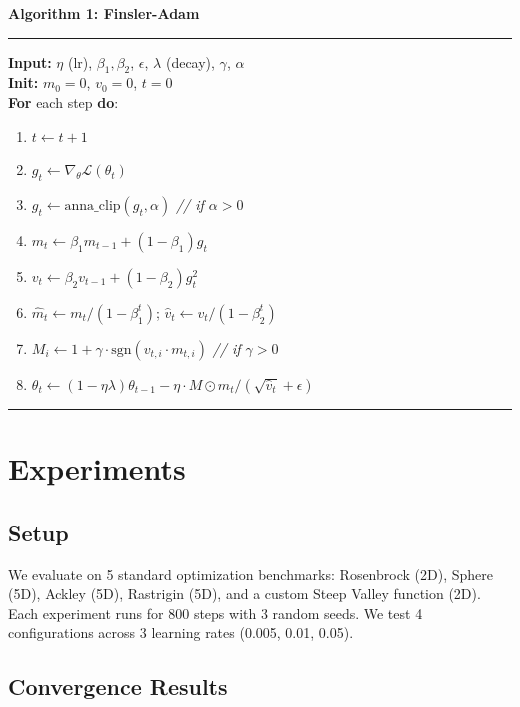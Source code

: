 \documentclass[11pt,a4paper,twocolumn]{article}
\begin{document}
\noindent\textbf{Algorithm 1: Finsler-Adam}
\vspace{0.3em}
\hrule
\vspace{0.3em}
\noindent\textbf{Input:} $\eta$ (lr), $\beta_1, \beta_2$, $\epsilon$, $\lambda$ (decay), $\gamma$, $\alpha$\\
\textbf{Init:} $m_0 = 0$, $v_0 = 0$, $t = 0$\\
\textbf{For} each step \textbf{do}:
\begin{enumerate}
  \setlength{\itemsep}{1pt}
  \item $t \leftarrow t + 1$
  \item $g_t \leftarrow \nabla_\theta \mathcal{L}(\theta_t)$
  \item $g_t \leftarrow \text{anna\_clip}(g_t, \alpha)$ \hfill\textit{// if $\alpha > 0$}
  \item $m_t \leftarrow \beta_1 m_{t-1} + (1-\beta_1) g_t$
  \item $v_t \leftarrow \beta_2 v_{t-1} + (1-\beta_2) g_t^2$
  \item $\hat{m}_t \leftarrow m_t / (1 - \beta_1^t)$; \quad $\hat{v}_t \leftarrow v_t / (1 - \beta_2^t)$
  \item $M_i \leftarrow 1 + \gamma \cdot \text{sgn}(v_{t,i} \cdot m_{t,i})$ \hfill\textit{// if $\gamma > 0$}
  \item $\theta_t \leftarrow (1-\eta\lambda)\theta_{t-1} - \eta \cdot M \odot \hat{m}_t / (\sqrt{\hat{v}_t} + \epsilon)$
\end{enumerate}
\vspace{-0.3em}
\hrule

\section{Experiments}

\subsection{Setup}

We evaluate on 5 standard optimization benchmarks: Rosenbrock (2D), Sphere (5D), Ackley (5D), Rastrigin (5D), and a custom Steep Valley function (2D). Each experiment runs for 800 steps with 3 random seeds. We test 4 configurations across 3 learning rates (0.005, 0.01, 0.05).

\subsection{Convergence Results}
\end{document}
